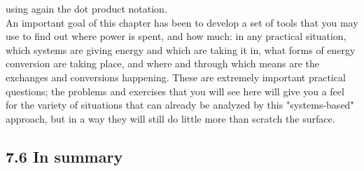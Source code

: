 \documentclass[10pt]{article}
\begin{document}
using again the dot product notation.\\
An important goal of this chapter has been to develop a set of tools that you may use to find out where power is spent, and how much: in any practical situation, which systems are giving energy and which are taking it in, what forms of energy conversion are taking place, and where and through which means are the exchanges and conversions happening. These are extremely important practical questions; the problems and exercises that you will see here will give you a feel for the variety of situations that can already be analyzed by this "systems-based" approach, but in a way they will still do little more than scratch the surface.

\subsection*{7.6 In summary}
\end{document}
